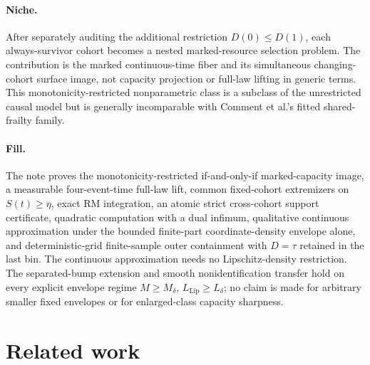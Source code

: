 \documentclass{article}
\begin{document}
\paragraph{Niche.} After separately auditing the additional restriction \(D(0)\le D(1)\), each always-survivor cohort becomes a nested marked-resource selection problem.  The contribution is the marked continuous-time fiber and its simultaneous changing-cohort surface image, not capacity projection or full-law lifting in generic terms.  This monotonicity-restricted nonparametric class is a subclass of the unrestricted causal model but is generally incomparable with Comment et al.'s fitted shared-frailty family.

\paragraph{Fill.} The note proves the monotonicity-restricted if-and-only-if marked-capacity image, a measurable four-event-time full-law lift, common fixed-cohort extremizers on \(S(t)\geq\eta\), exact RM integration, an atomic strict cross-cohort support certificate, quadratic computation with a dual infimum, qualitative continuous approximation under the bounded finite-part coordinate-density envelope alone, and deterministic-grid finite-sample outer containment with \(D=\tau\) retained in the last bin. The continuous approximation needs no Lipschitz-density restriction. The separated-bump extension and smooth nonidentification transfer hold on every explicit envelope regime \(M\geq M_\delta\), \(L_{\mathrm{Lip}}\geq L_\delta\); no claim is made for arbitrary smaller fixed envelopes or for enlarged-class capacity sharpness.

\section{Related work}
\end{document}

